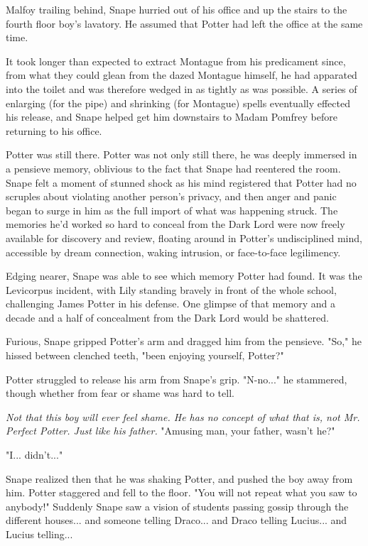 \documentclass[a4paper,11pt]{article}
\begin{document}
Malfoy trailing behind, Snape hurried out of his office and up the stairs to the fourth floor boy's lavatory. He assumed that Potter had left the office at the same time.

It took longer than expected to extract Montague from his predicament since, from what they could glean from the dazed Montague himself, he had apparated into the toilet and was therefore wedged in as tightly as was possible. A series of enlarging (for the pipe) and shrinking (for Montague) spells eventually effected his release, and Snape helped get him downstairs to Madam Pomfrey before returning to his office.

Potter was still there. Potter was not only still there, he was deeply immersed in a pensieve memory, oblivious to the fact that Snape had reentered the room. Snape felt a moment of stunned shock as his mind registered that Potter had no scruples about violating another person's privacy, and then anger and panic began to surge in him as the full import of what was happening struck. The memories he'd worked so hard to conceal from the Dark Lord were now freely available for discovery and review, floating around in Potter's undisciplined mind, accessible by dream connection, waking intrusion, or face-to-face legilimency.

Edging nearer, Snape was able to see which memory Potter had found. It was the Levicorpus incident, with Lily standing bravely in front of the whole school, challenging James Potter in his defense. One glimpse of that memory and a decade and a half of concealment from the Dark Lord would be shattered.

Furious, Snape gripped Potter's arm and dragged him from the pensieve. "So," he hissed between clenched teeth, "been enjoying yourself, Potter?"

Potter struggled to release his arm from Snape's grip. "N-no..." he stammered, though whether from fear or shame was hard to tell.

\emph{Not that this boy will ever feel shame. He has no concept of what that is, not Mr. Perfect Potter. Just like his father.} "Amusing man, your father, wasn't he?"

"I... didn't..."

Snape realized then that he was shaking Potter, and pushed the boy away from him. Potter staggered and fell to the floor. "You will not repeat what you saw to anybody!" Suddenly Snape saw a vision of students passing gossip through the different houses... and someone telling Draco... and Draco telling Lucius... and Lucius telling...
\end{document}
